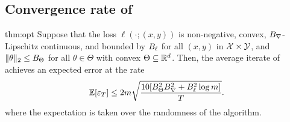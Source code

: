 \subsection{Convergence rate of }\label{sec:proof_opt}

\begin{repproposition}{thm:opt}
  Suppose that the loss $\ell(\cdot; (x, y))$ is non-negative, convex, $B_\nabla$-Lipschitz continuous, and bounded by $B_\ell$ for all $(x, y)$ in $\mathcal{X} \times \mathcal{Y}$, and $\|\theta\|_2\le B_\Theta$ for all $\theta\in\Theta$ with convex $\Theta \subseteq \mathbb{R}^d$.
  Then, the average iterate of  achieves an expected error at the rate
  \begin{align}
    \mathbb{E}[\varepsilon_T]
      \le 2m\sqrt{\frac{10[B_\Theta^2B_\nabla^2 + B_\ell^2\log m]}{T}}.
  \end{align}
  where the expectation is taken over the randomness of the algorithm.
\end{repproposition}

